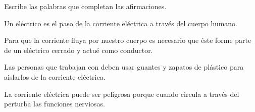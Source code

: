 Escribe las palabras que completan las afirmaciones.

\begin{parts}
    Un \fillin[choque][2cm] eléctrico es el paso de la corriente eléctrica a través del cuerpo humano.

    Para que la corriente fluya por nuestro cuerpo es necesario que éste forme parte de un \fillin[circuito][2cm]
    eléctrico cerrado y actué como conductor.

    Las personas que trabajan con \fillin[electricidad][2cm]
    deben usar guantes y zapatos de plástico para aislarlos de la corriente eléctrica.

    La corriente eléctrica puede ser peligrosa porque cuando circula a través del
    \fillin[cuerpo][2cm] perturba las funciones nerviosas.
\end{parts}